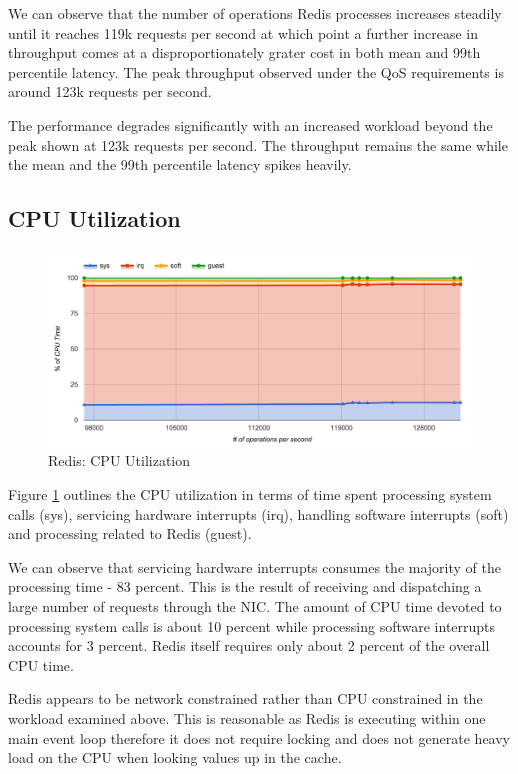 We can observe that the number of operations Redis processes increases steadily until it reaches 119k requests per second at which point a further increase in throughput comes at a disproportionately grater cost in both mean and 99th percentile latency. The peak throughput observed under the QoS requirements is around 123k requests per second.

The performance degrades significantly with an increased workload beyond the peak shown at 123k requests per second. The throughput remains the same while the mean and the 99th percentile latency spikes heavily.


\subsection{CPU Utilization}

\begin{figure}[h]
    \includegraphics[width=\textwidth]{./res/6_default_cpu.png}
    \caption{Redis: CPU Utilization}
    \label{fig:redis-default-cpu}
\end{figure}

Figure \ref{fig:redis-default-cpu} outlines the CPU utilization in terms of time spent processing system calls (sys), servicing hardware interrupts (irq), handling software interrupts (soft) and processing related to Redis (guest).

We can observe that servicing hardware interrupts consumes the majority of the processing time - 83 percent. This is the result of receiving and dispatching a large number of requests through the NIC. The amount of CPU time devoted to processing system calls is about 10 percent while processing software interrupts accounts for 3 percent. Redis itself requires only about 2 percent of the overall CPU time.

Redis appears to be network constrained rather than CPU constrained in the workload examined above. This is reasonable as Redis is executing within one main event loop therefore it does not require locking and does not generate heavy load on the CPU when looking values up in the cache.


